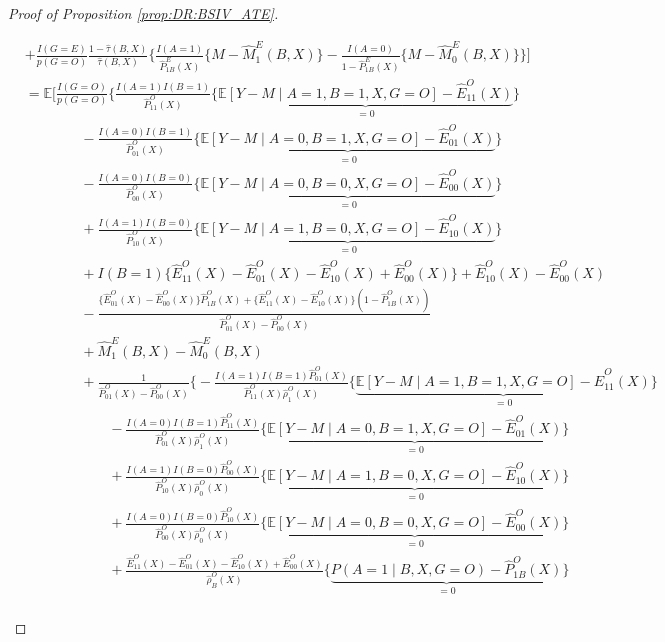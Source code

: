 \documentclass[10pt]{article}
\newcommand{\E}{\mathbb{E}}
\begin{document}
\begin{proof}[Proof of Proposition \ref{prop:DR:BSIV_ATE}]
\begin{itemize}
{\begin{align*}
    &+\frac{I(G=E)}{p(G=O)}\frac{1-\hat{\tau}(B,X)}{\hat{\tau}(B,X)}\bigg\{\frac{I(A=1)}{\hat{P}_{1B}^E(X)}\{M-\hat{M}_1^E(B,X)\}-\frac{I(A=0)}{1-\hat{P}_{1B}^E(X)}\{M-\hat{M}_0^E(B,X)\}\bigg\}\Big]\\
    &=\E\Big[\frac{I(G=O)}{p(G=O)}\Bigg\{\frac{I(A=1)I(B=1)}{\hat{P}_{11}^O(X)}\{\underbrace{\E[Y-M\mid A=1,B=1,X,G=O]-\hat{E}_{11}^O(X)}_{=0}\}\\
    &\ \ \ \ \ \ \ \ \ \ \ \ \ \ \ \ \ \ -\frac{I(A=0)I(B=1)}{\hat{P}_{01}^O(X)}\{\underbrace{\E[Y-M\mid A=0,B=1,X,G=O]-\hat{E}_{01}^O(X)}_{=0}\}\\
    &\ \ \ \ \ \ \ \ \ \ \ \ \ \ \ \ \ \ -\frac{I(A=0)I(B=0)}{\hat{P}_{00}^O(X)}\{\underbrace{\E[Y-M\mid A=0,B=0,X,G=O]-\hat{E}_{00}^O(X)}_{=0}\}\\
    &\ \ \ \ \ \ \ \ \ \ \ \ \ \ \ \ \ \ +\frac{I(A=1)I(B=0)}{\hat{P}_{10}^O(X)}\{\underbrace{\E[Y-M\mid A=1,B=0,X,G=O]-\hat{E}_{10}^O(X)}_{=0}\}\\
    &\ \ \ \ \ \ \ \ \ \ \ \ \ \ \ \ \ \ +I(B=1)\{\hat{E}_{11}^O(X)-\hat{E}_{01}^O(X)-\hat{E}_{10}^O(X)+\hat{E}_{00}^O(X)\}+\hat{E}_{10}^O(X)-\hat{E}_{00}^O(X)\\
    &\ \ \ \ \ \ \ \ \ \ \ \ \ \ \ \ \ \ -\frac{\{\hat{E}_{01}^O(X)-\hat{E}_{00}^O(X)\}\hat{P}_{1B}^O(X)+\{\hat{E}_{11}^O(X)-\hat{E}_{10}^O(X)\}(1-\hat{P}_{1B}^O(X))}{\hat{P}_{01}^O(X)-\hat{P}_{00}^O(X)}\\
    &\ \ \ \ \ \ \ \ \ \ \ \ \ \ \ \ \ \ +\hat{M}_1^E(B,X)-\hat{M}_0^E(B,X)\\
    &\ \ \ \ \ \ \ \ \ \ \ \ \ \ \ \ \ \ +\frac{1}{\hat{P}_{01}^O(X)-\hat{P}_{00}^O(X)}\bigg\{-\frac{I(A=1)I(B=1)\hat{P}_{01}^O(X)}{\hat{P}_{11}^O(X)\hat{\rho}_1^O(X)}\{\underbrace{\E[Y-M\mid A=1,B=1,X,G=O]-\hat{E}_{11}^O(X)}_{=0}\}\\
    &~~~~~~~~~~~~~~~~~~~~~~~~~~~-\frac{I(A=0)I(B=1)\hat{P}_{11}^O(X)}{\hat{P}_{01}^O(X)\hat{\rho}_1^O(X)}\{\underbrace{\E[Y-M\mid A=0,B=1,X,G=O]-\hat{E}_{01}^O(X)}_{=0}\}\\
    &~~~~~~~~~~~~~~~~~~~~~~~~~~~+\frac{I(A=1)I(B=0)\hat{P}_{00}^O(X)}{\hat{P}_{10}^O(X)\hat{\rho}_0^O(X)}\{\underbrace{\E[Y-M\mid A=1,B=0,X,G=O]-\hat{E}_{10}^O(X)}_{=0}\}\\
    &~~~~~~~~~~~~~~~~~~~~~~~~~~~+\frac{I(A=0)I(B=0)\hat{P}_{10}^O(X)}{\hat{P}_{00}^O(X)\hat{\rho}_0^O(X)}\{\underbrace{\E[Y-M\mid A=0,B=0,X,G=O]-\hat{E}_{00}^O(X)}_{=0}\}\\
    &~~~~~~~~~~~~~~~~~~~~~~~~~~~+\frac{\hat{E}_{11}^O(X)-\hat{E}_{01}^O(X)-\hat{E}_{10}^O(X)+\hat{E}_{00}^O(X)}{\hat{\rho}_B^O(X)}\big\{\underbrace{P(A=1\mid B,X,G=O)-\hat{P}_{1B}^O(X)}_{=0}\big\}\\

\end{align*}}
\end{itemize}
\end{proof}
\end{document}
